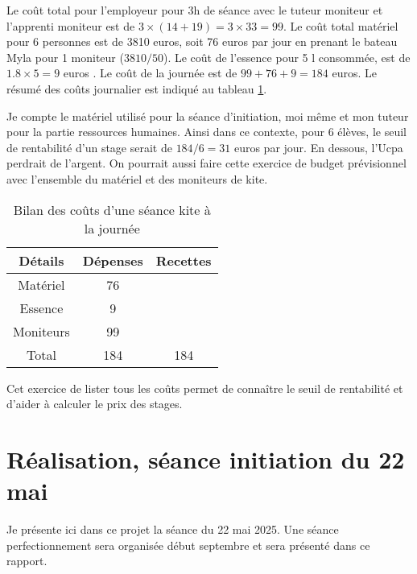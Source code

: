 \documentclass[11pt,a4paper]{report}
\begin{document}
Le coût total pour l'employeur pour 3h de séance avec le tuteur moniteur
et l'apprenti moniteur est de $3\times(14+19) = 3\times33 = 99 $.
Le coût total matériel pour 6 personnes est de 3810 euros, soit 76 euros
par jour  en prenant le bateau Myla pour 1 moniteur ($3810/50$).
Le coût de l'essence pour 5 l consommée, est de $1.8\times5 = 9$ euros .
Le coût de la journée est de $99 + 76 + 9 =  184 $ euros.
Le résumé des coûts journalier est indiqué au tableau \ref{cout_journalier}.

Je compte le matériel utilisé pour la séance d’initiation,
moi m\^eme et mon tuteur pour la partie ressources humaines.
Ainsi dans ce contexte,  pour 6 élèves, le seuil de rentabilité
d'un stage serait de $184/6 = 31$ euros
par jour. En dessous, l'Ucpa perdrait de l'argent.
On pourrait aussi faire cette exercice de budget prévisionnel avec
l'ensemble du matériel et des moniteurs de kite.

\begin{table}
\begin{centering}
\begin{tabular}{|c|c|c|}
\hline
\textbf{Détails}         & \textbf{Dépenses} & \textbf{Recettes}   \\
\hline
Matériel  & 76     &                     \\
\hline                                    
Essence   & 9      &                     \\
\hline              
Moniteurs  & 99    &                     \\
\hline
Total     & 184    &       184           \\
\hline
\end{tabular}
\caption{Bilan des co\^uts d'une séance kite à la journée\label{cout_journalier}}
\end{centering}
\end{table}

Cet exercice de lister tous les co\^uts permet de connaître le seuil 
de rentabilité et d'aider à calculer le prix des stages.
\FloatBarrier
\section{Réalisation, séance initiation du 22 mai}
Je présente ici dans ce projet la séance du 22 mai 2025.
Une séance perfectionnement sera organisée début septembre
et sera présenté dans ce rapport.
\end{document}
